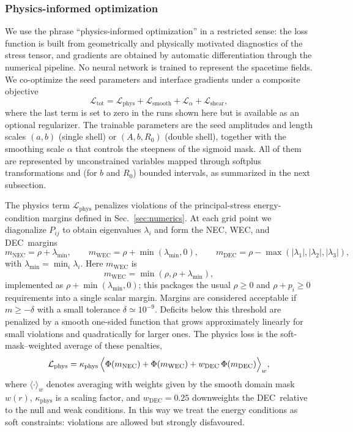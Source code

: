\documentclass[11pt]{article}
\makeatletter
\newcommand{\@abbr}[1]{\ifmmode\mathrm{#1}\else\textsc{#1}\fi}
\newcommand{\WEC}{\@abbr{WEC}}
\newcommand{\NEC}{\@abbr{NEC}}
\newcommand{\DEC}{\@abbr{DEC}}
\makeatother
\begin{document}
\subsubsection{Physics-informed optimization}
We use the phrase ``physics-informed optimization'' in a restricted sense: the loss function is built from geometrically and physically motivated diagnostics of the stress tensor, and gradients are obtained by automatic differentiation through the numerical pipeline. No neural network is trained to represent the spacetime fields.
We co-optimize the seed parameters and interface gradients under a composite objective
\[
\mathcal{L}_\text{tot} = \mathcal{L}_\text{phys} + \mathcal{L}_\text{smooth} + \mathcal{L}_\alpha + \mathcal{L}_\text{shear},
\]
where the last term is set to zero in the runs shown here but is available as an optional regularizer. The trainable parameters are the seed amplitudes and length scales $(a,b)$ (single shell) or $(A,b,R_0)$ (double shell), together with the smoothing scale $\alpha$ that controls the steepness of the sigmoid mask. All of them are represented by unconstrained variables mapped through softplus transformations and (for $b$ and $R_0$) bounded intervals, as summarized in the next subsection.

The physics term $\mathcal{L}_\text{phys}$ penalizes violations of the principal-stress energy-condition margins defined in Sec.~\ref{sec:numerics}. At each grid point we diagonalize $P_{ij}$ to obtain eigenvalues $\lambda_i$ and form the \NEC, \WEC, and \DEC\ margins
\begin{equation}
m_\text{NEC} = \rho + \lambda_{\min},\qquad
m_\text{WEC} = \rho + \min(\lambda_{\min},0),\qquad
m_\text{DEC} = \rho - \max(|\lambda_1|,|\lambda_2|,|\lambda_3|),
\end{equation}
with $\lambda_{\min}=\min_i\lambda_i$. Here $m_\text{WEC}$ is
\[
m_\text{WEC} = \min(\rho,\rho+\lambda_{\min}),
\]
implemented as $\rho + \min(\lambda_{\min},0)$; this packages the usual $\rho\ge0$ and $\rho+p_i\ge0$ requirements into a single scalar margin. Margins are considered acceptable if $m\ge -\delta$ with a small tolerance $\delta\simeq10^{-9}$. Deficits below this threshold are penalized by a smooth one-sided function that grows approximately linearly for small violations and quadratically for larger ones. The physics loss is the soft-mask–weighted average of these penalties,
\begin{equation}
\mathcal{L}_\text{phys} = \kappa_\text{phys}\,\Bigl\langle
\Phi(m_\text{NEC}) + \Phi(m_\text{WEC}) + w_\text{DEC}\,\Phi(m_\text{DEC})
\Bigr\rangle_w,
\end{equation}
where $\langle\cdot\rangle_w$ denotes averaging with weights given by the smooth domain mask $w(r)$, $\kappa_\text{phys}$ is a scaling factor, and $w_\text{DEC}=0.25$ downweights the \DEC\ relative to the null and weak conditions. In this way we treat the energy conditions as soft constraints: violations are allowed but strongly disfavoured.
\end{document}
